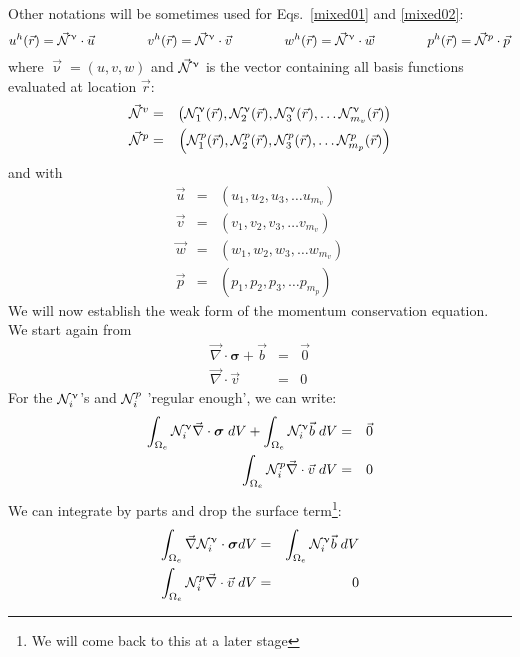 Other notations will be sometimes used for Eqs.~\eqref{mixed01} and \eqref{mixed02}:
\begin{equation}
u^h({\vec r}) = \vec{{\mathcal{N}}}^\upnu \cdot \vec{u}
\quad\quad\quad\quad
v^h({\vec r}) = \vec{{\mathcal{N}}}^\upnu \cdot \vec{v}
\quad\quad\quad\quad
w^h({\vec r}) = \vec{{\mathcal{N}}}^\upnu \cdot \vec{w}
\quad\quad\quad\quad
p^h({\vec r}) = \vec{{\mathcal{N}}}^p \cdot \vec{p}
\end{equation} 
where ${\vec \upnu}=(u,v,w)$ and $\vec{{\mathcal{N}}}^\upnu$ is the vector containing 
all basis functions evaluated at location ${\vec r}$:
\begin{eqnarray}
\vec{{\mathcal{N}}}^v &=& \left( {\mathcal{N}}_1^\upnu({\vec r}),  {\mathcal{N}}_2^\upnu({\vec r}),  
{\mathcal{N}}_3^\upnu({\vec r}), \dots  {\mathcal{N}}_{m_v}^\upnu({\vec r}) \right) \\
\vec{{\mathcal{N}}}^p &=& \left( {\mathcal{N}}_1^p({\vec r}),  {\mathcal{N}}_2^p({\vec r}),  
{\mathcal{N}}_3^p({\vec r}), \dots  {\mathcal{N}}_{m_p}^p({\vec r}) \right)
\end{eqnarray}
and with 
\begin{eqnarray}
\vec{u} &=& \left( u_1,  u_2,  u_3, \dots  u_{m_v} \right) \\
\vec{v} &=& \left( v_1,  v_2,  v_3, \dots  v_{m_v} \right) \\
\vec{w} &=& \left( w_1,  w_2,  w_3, \dots  w_{m_v} \right) \\
\vec{p} &=& \left( p_1,  p_2,  p_3, \dots  p_{m_p} \right) 
\end{eqnarray}
We will now establish the weak form of the momentum conservation equation. 
We start again from 
\begin{eqnarray}
{\vec \nabla}\cdot {\bm \sigma} + {\vec b} &=& {\vec 0} \\
{\vec \nabla}\cdot {\vec v} &=& 0
\end{eqnarray}
For the ${\mathcal{N}}_i^\upnu$'s and ${\mathcal{N}}_i^p$ 'regular enough', we can write:
\begin{eqnarray}
\int_{\Omega_e} {\mathcal{N}}_i^\upnu {\vec \nabla}\cdot {\bm \sigma}\;  dV
+ \int_{\Omega_e} {\mathcal{N}}_i^\upnu  {\vec b} \; dV
&=& \vec 0 \\
\int_{\Omega_e} {\mathcal{N}}_i^p {\vec \nabla}\cdot {\vec v} \; dV &=& 0
\end{eqnarray}
We can integrate by parts and drop the surface term\footnote{We will come back to this at a later stage}:
\begin{eqnarray}
\int_{\Omega_e} {\vec \nabla } {\mathcal{N}}_i^\upnu \cdot {\bm \sigma} dV
&=& \int_{\Omega_e} {\mathcal{N}}_i^\upnu  {\vec b} \; dV \\
\int_{\Omega_e} {\mathcal{N}}_i^p {\vec \nabla}\cdot {\vec v} \; dV &=& 0
\end{eqnarray}
